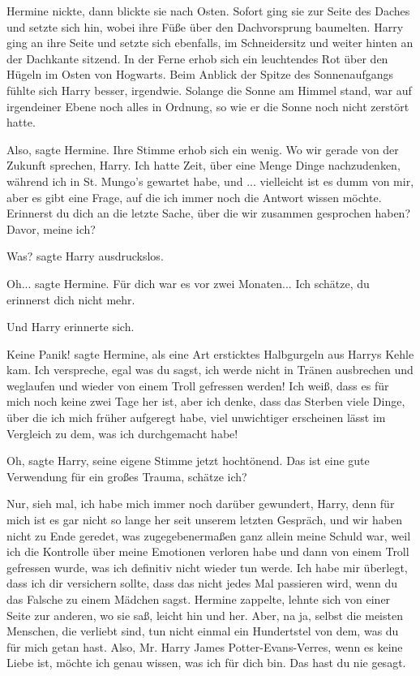 Hermine nickte, dann blickte sie nach Osten. Sofort ging sie zur Seite des
Daches und setzte sich hin, wobei ihre Füße über den Dachvorsprung baumelten.
Harry ging an ihre Seite und setzte sich ebenfalls, im Schneidersitz und weiter
hinten an der Dachkante sitzend. In der Ferne erhob sich ein leuchtendes Rot
über den Hügeln im Osten von Hogwarts. Beim Anblick der Spitze des
Sonnenaufgangs fühlte sich Harry besser, irgendwie. Solange die Sonne am Himmel
stand, war auf irgendeiner Ebene noch alles in Ordnung, so wie er die Sonne noch
nicht zerstört hatte.

\glqq{}Also\grqq{}, sagte Hermine. Ihre Stimme erhob sich ein wenig. \glqq{}Wo wir
gerade von der Zukunft sprechen, Harry. Ich hatte Zeit, über eine Menge Dinge
nachzudenken, während ich in St. Mungo's gewartet habe, und ... vielleicht ist
es dumm von mir, aber es gibt eine Frage, auf die ich immer noch die Antwort
wissen möchte. Erinnerst du dich an die letzte Sache, über die wir zusammen
gesprochen haben? Davor, meine ich?\grqq{}

\glqq{}Was?\grqq{} sagte Harry ausdruckslos.

\glqq{}Oh...\grqq{} sagte Hermine. \glqq{}Für dich war es vor zwei Monaten... Ich
schätze, du erinnerst dich nicht mehr.\grqq{}

Und Harry erinnerte sich.

\glqq{}Keine Panik!\grqq{} sagte Hermine, als eine Art ersticktes Halbgurgeln aus
Harrys Kehle kam. \glqq{}Ich verspreche, egal was du sagst, ich werde nicht in
Tränen ausbrechen und weglaufen und wieder von einem Troll gefressen werden! Ich
weiß, dass es für mich noch keine zwei Tage her ist, aber ich denke, dass das
Sterben viele Dinge, über die ich mich früher aufgeregt habe, viel unwichtiger
erscheinen lässt im Vergleich zu dem, was ich durchgemacht habe!\grqq{}

\glqq{}Oh\grqq{}, sagte Harry, seine eigene Stimme jetzt hochtönend. \glqq{}Das
ist eine gute Verwendung für ein großes Trauma, schätze ich?\grqq{}

\glqq{}Nur, sieh mal, ich habe mich immer noch darüber gewundert, Harry, denn für
mich ist es gar nicht so lange her seit unserem letzten Gespräch, und wir haben
nicht zu Ende geredet, was zugegebenermaßen ganz allein meine Schuld war, weil
ich die Kontrolle über meine Emotionen verloren habe und dann von einem Troll
gefressen wurde, was ich definitiv nicht wieder tun werde. Ich habe mir
überlegt, dass ich dir versichern sollte, dass das nicht jedes Mal passieren
wird, wenn du das Falsche zu einem Mädchen sagst.\grqq{} Hermine zappelte, lehnte sich
von einer Seite zur anderen, wo sie saß, leicht hin und her. \glqq{}Aber, na ja,
selbst die meisten Menschen, die verliebt sind, tun nicht einmal ein Hundertstel
von dem, was du für mich getan hast. Also, Mr. Harry James Potter-Evans-Verres,
wenn es keine Liebe ist, möchte ich genau wissen, was ich für dich bin. Das hast
du nie gesagt.\grqq{}

